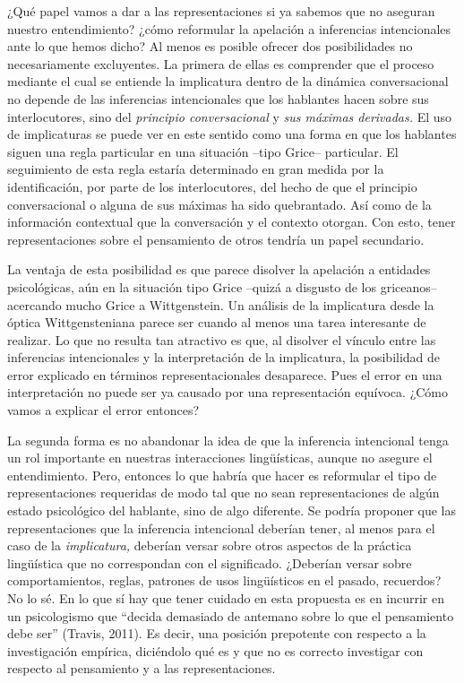 \documentclass[]{book}
\begin{document}
\begin{refsection}
¿Qué papel vamos a dar a las representaciones si ya sabemos que no
aseguran nuestro entendimiento? ¿cómo reformular la apelación a
inferencias intencionales ante lo que hemos dicho? Al menos es posible
ofrecer dos posibilidades no necesariamente excluyentes. La primera de
ellas es comprender que el proceso mediante el cual se entiende la
implicatura dentro de la dinámica conversacional no depende de las
inferencias intencionales que los hablantes hacen sobre sus
interlocutores, sino del \emph{principio conversacional} y \emph{sus
máximas derivadas.} El uso de implicaturas se puede ver en este sentido
como una forma en que los hablantes siguen una regla particular en una
situación --tipo Grice-- particular. El seguimiento de esta regla
estaría determinado en gran medida por la identificación, por parte de
los interlocutores, del hecho de que el principio conversacional o
alguna de sus máximas ha sido quebrantado. Así como de la información
contextual que la conversación y el contexto otorgan. Con esto, tener
representaciones sobre el pensamiento de otros tendría un papel
secundario.

La ventaja de esta posibilidad es que parece disolver la apelación a
entidades psicológicas, aún en la situación tipo Grice --quizá a
disgusto de los griceanos-- acercando mucho Grice a Wittgenstein. Un
análisis de la implicatura desde la óptica Wittgensteniana parece ser
cuando al menos una tarea interesante de realizar. Lo que no resulta tan
atractivo es que, al disolver el vínculo entre las inferencias
intencionales y la interpretación de la implicatura, la posibilidad de
error explicado en términos representacionales desaparece. Pues el error
en una interpretación no puede ser ya causado por una representación
equívoca. ¿Cómo vamos a explicar el error entonces?

La segunda forma es no abandonar la idea de que la inferencia
intencional tenga un rol importante en nuestras interacciones
lingüísticas, aunque no asegure el entendimiento. Pero, entonces lo que
habría que hacer es reformular el tipo de representaciones requeridas de
modo tal que no sean representaciones de algún estado psicológico del
hablante, sino de algo diferente. Se podría proponer que las
representaciones que la inferencia intencional deberían tener, al menos
para el caso de la \emph{implicatura,} deberían versar sobre otros
aspectos de la práctica lingüística que no correspondan con el
significado. ¿Deberían versar sobre comportamientos, reglas, patrones de
usos lingüísticos en el pasado, recuerdos? No lo sé. En lo que sí hay
que tener cuidado en esta propuesta es en incurrir en un psicologismo
que ``decida demasiado de antemano sobre lo que el pensamiento debe
ser'' (Travis, 2011). Es decir, una posición prepotente con respecto a
la investigación empírica, diciéndolo qué es y que no es correcto
investigar con respecto al pensamiento y a las representaciones.


\end{refsection}
\end{document}
